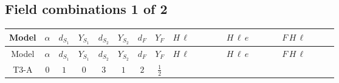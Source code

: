 \documentclass[8pt]{article}
\begin{document}
\begin{landscape}
\subsection*{Field combinations 1 of 2}
\begin{longtable}{@{}cccccccc >{\raggedright\arraybackslash}p{0.21\linewidth} >{\raggedright\arraybackslash}p{0.21\linewidth} >{\raggedright\arraybackslash}p{0.21\linewidth}@{}}
\toprule
Model & $\alpha$ & $d_{S_1}$ & $Y_{S_1}$ & $d_{S_2}$ & $Y_{S_2}$ & $d_F$ & $Y_F$ & $H\,\ell$ & $H\,\ell\,e$ & $F\,H\,\ell$ \\
\midrule
\endfirsthead
\toprule
Model & $\alpha$ & $d_{S_1}$ & $Y_{S_1}$ & $d_{S_2}$ & $Y_{S_2}$ & $d_F$ & $Y_F$ & $H\,\ell$ & $H\,\ell\,e$ & $F\,H\,\ell$ \\
\midrule
\endhead
T3-A & $0$ & $1$ & $0$ & $3$ & $1$ & $2$ & $\frac{1}{2}$ & \scriptsize\adjustbox{max width=\linewidth}{$\begin{gathered} +\frac{2 \hbar  \overline{y_{1,i_1,r_1}} \overline{y_{2,i_2,r_1}} L_{a_4,i_2}{}^T\, C\, P_L\, L_{a_2,i_1} H_{a_1} H_{a_3} \lambda_5 \epsilon_{a_1,a_2} \epsilon_{a_3,a_4}}{\sqrt{3} \epsilon  M_F} \\ +\frac{2 \hbar  \overline{y_{1,i_1,r_1}} \overline{y_{2,i_2,r_1}} L_{a_4,i_2}{}^T\, C\, P_L\, L_{a_2,i_1} H_{a_1} H_{a_3} \lambda_5 \epsilon_{a_1,a_2} \epsilon_{a_3,a_4}}{\sqrt{3} M_F} \\ +\frac{2 \hbar  \overline{\lambda_5} \overline{L_{a_3,i_1}}\, C\, P_R\, \overline{L_{a_4,i_2}}{}^T y_{1,i_1,r_1} y_{2,i_2,r_1} \epsilon_{a_1,a_3} \epsilon_{a_2,a_4} H_{a_1}{}^{\dagger } H_{a_2}{}^{\dagger }}{\sqrt{3} \epsilon  M_F}\end{gathered}$} & \scriptsize\adjustbox{max width=\linewidth}{$\begin{gathered} \frac{\hbar  \overline{y_{1,i_3,r_1}} \overline{L_{a_1,i_2}}\, P_R\, e_{i_1} H_{a_1} y_{1,i_2,r_1} Y_{e,i_3,i_1}}{4 \epsilon } \\ +\frac{3}{8} \hbar  \overline{y_{1,i_3,r_1}} \overline{L_{a_1,i_2}}\, P_R\, e_{i_1} H_{a_1} y_{1,i_2,r_1} Y_{e,i_3,i_1} \\ +\frac{\sqrt{3} \hbar  \overline{y_{2,i_3,r_1}} \overline{L_{a_1,i_2}}\, P_R\, e_{i_1} H_{a_1} y_{2,i_2,r_1} Y_{e,i_3,i_1}}{4 \epsilon }\end{gathered}$} & \scriptsize\adjustbox{max width=\linewidth}{$\begin{gathered} +\frac{2 \hbar  \log \left(\frac{\bar{\mu}^{2}}{M_F^2}\right) \overline{y_{1,i_1,r_1}} \overline{y_{2,i_2,r_1}} L_{a_4,i_2}{}^T\, C\, P_L\, L_{a_2,i_1} H_{a_1} H_{a_3} \lambda_5 \epsilon_{a_1,a_2} \epsilon_{a_3,a_4}}{\sqrt{3} M_F} \\ +\frac{2 \hbar  \log \left(\frac{\bar{\mu}^{2}}{M_F^2}\right) \overline{\lambda_5} \overline{L_{a_3,i_1}}\, C\, P_R\, \overline{L_{a_4,i_2}}{}^T y_{1,i_1,r_1} y_{2,i_2,r_1} \epsilon_{a_1,a_3} \epsilon_{a_2,a_4} H_{a_1}{}^{\dagger } H_{a_2}{}^{\dagger }}{\sqrt{3} M_F}\end{gathered}$} \\

\end{longtable}
\end{landscape}
\end{document}

